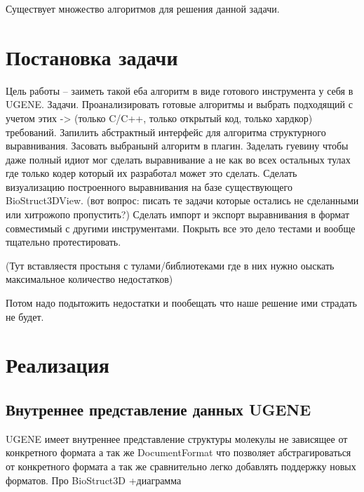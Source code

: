 \documentclass[a4paper, 12pt, titlepage, utf8]{extarticle}
\let\oldsection\section         %
\renewcommand{\section}{\newpage\oldsection}
\begin{document}
Существует множество алгоритмов для решения данной задачи. 

\section{Постановка задачи}	%

Цель работы -- заиметь такой еба алгоритм в виде готового инструмента у себя в UGENE. 
Задачи.
Проанализировать готовые алгоритмы и выбрать подходящий с учетом этих -> (только C/C++, только открытый код, только хардкор) требований. Запилить абстрактный интерфейс для алгоритма структурного выравнивания. Засовать выбранынй алгоритм в плагин. Заделать гуевину чтобы даже полный идиот мог сделать выравнивание а не как во всех остальных тулах где только кодер который их разработал может это сделать. Сделать визуализацию построенного выравнивания на базе существующего BioStruct3DView. (вот вопрос: писать те задачи которые остались не сделанными или хитрожопо пропустить?) Сделать импорт и экспорт выравнивания в формат совместимый с другими инструментами. Покрыть все это дело тестами и вообще тщательно протестировать.


(Тут вставляестя простыня с тулами/библиотеками где в них нужно оыскать максимальное количество недостатков)

Потом надо подытожить недостатки и пообещать что наше решение ими страдать не будет.


\section{Реализация}
\subsection{Внутреннее представление данных UGENE}
UGENE имеет внутреннее представление структуры молекулы не зависящее от конкретного формата а так же DocumentFormat что позволяет абстрагироваться от конкретного формата а так же сравнительно легко добавлять поддержку новых форматов.
Про BioStruct3D +диаграмма
\end{document}
